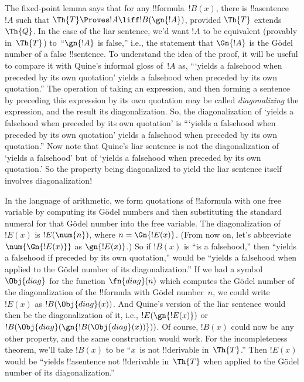 \documentclass[../../../include/open-logic-section]{subfiles}
\begin{document}


\begin{explain}
The fixed-point lemma says that for any !!{formula}~$!B(x)$, there is
!!a{sentence}~$!A$ such that $\Th{T} \Proves !A \liff !B(\gn{!A})$,
provided $\Th{T}$ extends~$\Th{Q}$.  In the case of the liar sentence,
we'd want $!A$ to be equivalent (provably in~$\Th{T}$) to~``$\gn{!A}$
is false,'' i.e., the statement that $\Gn{!A}$ is the G\"odel number
of a false !!{sentence}. To understand the idea of the proof, it will
be useful to compare it with Quine's informal gloss of~$!A$ as,
``{}`yields a falsehood when preceded by its own quotation' yields a
falsehood when preceded by its own quotation.''  The operation of
taking an expression, and then forming a sentence by preceding this
expression by its own quotation may be called \emph{diagonalizing} the
expression, and the result its diagonalization. So, the
diagonalization of `yields a falsehood when preceded by its own
quotation' is ``{}`yields a falsehood when preceded by its own
quotation' yields a falsehood when preceded by its own quotation.''
Now note that Quine's liar sentence is not the diagonalization of
`yields a falsehood' but of `yields a falsehood when preceded by its
own quotation.' So the property being diagonalized to yield the liar
sentence itself involves diagonalization!{}

In the language of arithmetic, we form quotations of !!a{formula} with
one free variable by computing its G\"odel numbers and then
substituting the standard numeral for that G\"odel number into the
free variable. The diagonalization of~$!E(x)$ is $!E(\num{n})$, where
$n = \Gn{!E(x)}$. (From now on, let's abbreviate $\num{\Gn{!E(x)}}$ as
$\gn{!E(x)}$.)  So if $!B(x)$ is ``is a falsehood,'' then ``yields a
falsehood if preceded by its own quotation,'' would be ``yields a
falsehood when applied to the G\"odel number of its diagonalization.''
If we had a symbol~$\Obj{diag}$ for the function $\fn{diag}(n)$ which
computes the G\"odel number of the diagonalization of the !!{formula}
with G\"odel number~$n$, we could write $!E(x)$ as
$!B(\Obj{diag}(x))$. And Quine's version of the liar sentence would
then be the diagonalization of it, i.e., $!E(\gn{!E(x)})$ or
$!B(\Obj{diag}(\gn{!B(\Obj{diag}(x))}))$.  Of course, $!B(x)$ could
now be any other property, and the same construction would work. For
the incompleteness theorem, we'll take $!B(x)$ to be ``$x$~is not
!!{derivable} in~$\Th{T}$.'' Then $!E(x)$ would be ``yields
!!a{sentence} not !!{derivable} in~$\Th{T}$ when applied to the
G\"odel number of its diagonalization.''


\end{explain}
\end{document}
